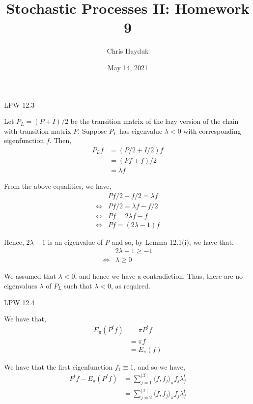 \documentclass[12pt]{article}
\newenvironment{problem}[2][Problem]{\begin{trivlist}
\item[\hskip \labelsep {\bfseries #1}\hskip \labelsep {\bfseries #2.}]}{\end{trivlist}}
\begin{document}
\title{Stochastic Processes II: Homework 9}

\author{Chris Hayduk}
\date{May 14, 2021}

\maketitle

\begin{problem}{I}
LPW 12.3
\end{problem}

Let $P_L = (P + I)/2$ be the transition matrix of the lazy version of the chain with transition matrix $P$. Suppose $P_L$ has eigenvalue $\lambda < 0$ with corresponding eigenfunction $f$. Then,
\begin{align*}
P_L f &= (P/2 + I/2) f\\
&= (Pf + f)/2\\
&= \lambda f
\end{align*}

From the above equalities, we have,
\begin{align*}
&Pf/2 + f/2 = \lambda f\\
\iff &Pf/2 = \lambda f - f/2\\
\iff &Pf = 2 \lambda f - f\\
\iff &Pf = (2\lambda - 1)f
\end{align*}

Hence, $2\lambda - 1$ is an eigenvalue of $P$ and so, by Lemma 12.1(i), we have that,
\begin{align*}
&2 \lambda - 1 \geq -1\\
\iff &\lambda \geq 0
\end{align*}

We assumed that $\lambda < 0$, and hence we have a contradiction. Thus, there are no eigenvalues $\lambda$ of $P_L$ such that $\lambda < 0$, as required.

\newpage
\begin{problem}{II}
LPW 12.4
\end{problem}

We have that,
\begin{align*}
E_{\pi}(P^tf) &= \pi P^t f\\
&= \pi f\\
&= E_{\pi}(f)
\end{align*}

We have that the first eigenfunction $f_1 \equiv 1$, and so we have,
\begin{align*}
P^t f - E_{\pi}(P^t f) &= \sum_{j=1}^{| \mathcal{X} |} \langle f, f_j \rangle_{\pi} f_j \lambda_j^t\\
&= \sum_{j=2}^{| \mathcal{X} |} \langle f, f_j \rangle_{\pi} f_j \lambda_j^t
\end{align*}
\end{document}
